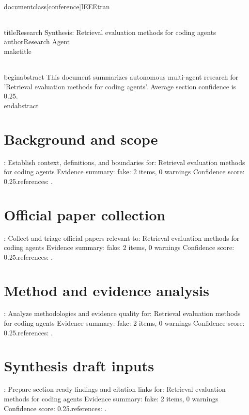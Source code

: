 \\documentclass[conference]{IEEEtran}
\begin{document}
\\titleResearch Synthesis: Retrieval evaluation methods for coding agents
\\authorResearch Agent
\\maketitle

\\begin{abstract}
This document summarizes autonomous multi-agent research for 'Retrieval evaluation methods for coding agents'. Average section confidence is 0.25.
\\end{abstract}

\section{Background and scope}\nObjective: Establish context, definitions, and boundaries for: Retrieval evaluation methods for coding agents
Evidence summary: fake: 2 items, 0 warnings
Confidence score: 0.25.\nSupporting references: \cite{t1_fake_1,t1_fake_2,t2_fake_1,t2_fake_2,t3_fake_1,t3_fake_2,t4_fake_1,t4_fake_2}.\n\n\section{Official paper collection}\nObjective: Collect and triage official papers relevant to: Retrieval evaluation methods for coding agents
Evidence summary: fake: 2 items, 0 warnings
Confidence score: 0.25.\nSupporting references: \cite{t1_fake_1,t1_fake_2,t2_fake_1,t2_fake_2,t3_fake_1,t3_fake_2,t4_fake_1,t4_fake_2}.\n\n\section{Method and evidence analysis}\nObjective: Analyze methodologies and evidence quality for: Retrieval evaluation methods for coding agents
Evidence summary: fake: 2 items, 0 warnings
Confidence score: 0.25.\nSupporting references: \cite{t1_fake_1,t1_fake_2,t2_fake_1,t2_fake_2,t3_fake_1,t3_fake_2,t4_fake_1,t4_fake_2}.\n\n\section{Synthesis draft inputs}\nObjective: Prepare section-ready findings and citation links for: Retrieval evaluation methods for coding agents
Evidence summary: fake: 2 items, 0 warnings
Confidence score: 0.25.\nSupporting references: \cite{t1_fake_1,t1_fake_2,t2_fake_1,t2_fake_2,t3_fake_1,t3_fake_2,t4_fake_1,t4_fake_2}.

\
\

\
\end{document}
